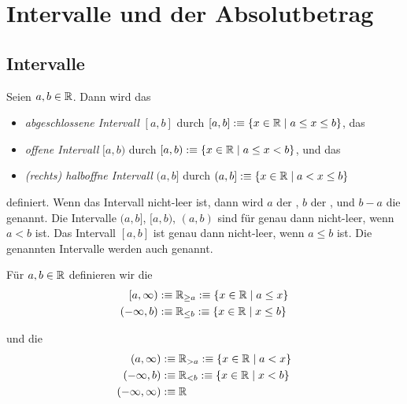 \section{Intervalle und der Absolutbetrag}

\subsection{Intervalle}

\begin{mydef}[Intervalle]
  Seien $a,b \in \mathbb{R}$. Dann wird das
  \begin{itemize}
    \item \emph{abgeschlossene Intervall} $[a,b]$ durch
    $[a,b] :\equiv \{ x \in \mathbb{R} \mid a \leq x \leq b \}$, das
    \item \emph{offene Intervall} $[a,b)$ durch
    $[a,b) :\equiv \{x \in \mathbb{R} \mid a \leq x < b \}$, und das
    \item \emph{(rechts) halboffne Intervall} $(a,b]$ durch
    $(a,b] :\equiv \{ x \in \mathbb{R} \mid a < x \leq b \}$
  \end{itemize}
  definiert. Wenn das Intervall nicht-leer ist, dann wird $a$ der , $b$ der , und $b-a$ die  genannt. Die Intervalle $(a,b]$, $[a,b)$, $(a,b)$ sind für genau dann nicht-leer, wenn $a<b$ ist. Das Intervall $[a,b]$ ist genau dann nicht-leer, wenn $a\leq b$ ist. Die genannten Intervalle werden auch  genannt.
\end{mydef}

\begin{mydef}
  Für $a,b \in \mathbb{R}$ definieren wir die 
  \[
    \begin{aligned}
      [a, \infty) &:\equiv \real_{\geq a} :\equiv \{x \in \real \mid a \leq x \} \\
      (-\infty, b) &:\equiv \real_{\leq b} :\equiv \{ x \in \real \mid x \leq b \}
    \end{aligned}
  \]

  und die 
  \[
    \begin{aligned}
      (a, \infty) &:\equiv \mathbb{R}_{>a} :\equiv \{ x \in \mathbb{R} \mid a < x \} \\
      (-\infty, b) &:\equiv \mathbb{R}_{<b} :\equiv \{ x \in \mathbb{R} \mid x < b \} \\
      (-\infty, \infty) &:\equiv \mathbb{R}
    \end{aligned}
  \]
\end{mydef}

